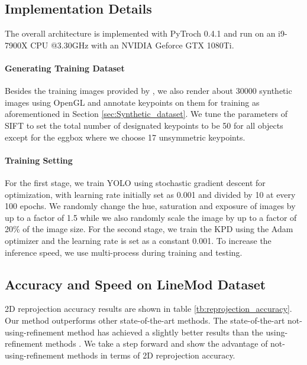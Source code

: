 \documentclass[10pt,twocolumn,letterpaper]{article}
\begin{document}
\subsection{Implementation Details}
The overall architecture is implemented with PyTroch 0.4.1 and run on an i9-7900X CPU @3.30GHz with an NVIDIA Geforce GTX 1080Ti.

\paragraph{Generating Training Dataset} Besides the training images provided by \cite{tekin18}, we also render about 30000 synthetic images using OpenGL and annotate keypoints on them for training as aforementioned in Section \ref{sec:Synthetic_dataset}. We tune the parameters of SIFT to set the total number of designated keypoints to be 50 for all objects except for the eggbox where we choose 17 unsymmetric keypoints.

\paragraph{Training Setting} For the first stage, we train YOLO using stochastic gradient descent for optimization, with learning rate initially set as 0.001 and divided by 10 at every 100 epochs. We randomly change the hue, saturation and exposure of images by up to a factor of 1.5 while we also randomly scale the image by up to a factor of 20\% of the image size. For the second stage, we train the KPD using the Adam optimizer \cite{Kingma2014AdamAM} and the learning rate is set as a constant 0.001. To increase the inference speed, we use multi-process during training and testing.

\subsection{Accuracy and Speed on LineMod Dataset}

2D reprojection accuracy results are shown in table \ref{tb:reprojection_accuracy}. Our method outperforms other state-of-the-art methods. The state-of-the-art not-using-refinement method \cite{tekin18} has achieved a slightly better results than the using-refinement methods \cite{7780735, Rad2017BB8AS}. We take a step forward and show the advantage of not-using-refinement methods in terms of 2D reprojection accuracy.
\end{document}
